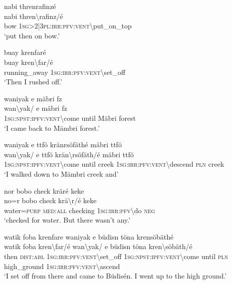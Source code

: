 \ea\label{ex:13:a1406}
nabi threnrafinzé\\
\gll nabi	thren{\textbackslash}rafinz/é\\
     bow	1\textsc{sg}>2|3\textsc{pl}:\textsc{irr}:\textsc{pfv}:\textsc{vent}{\textbackslash}put\_on\_top\\
\glt `put then on bow.'
\z

\ea\label{ex:13:a1407}
buay krenfaré\\
\gll buay	kren{\textbackslash}far/é\\
     running\_away	1\textsc{sg}:\textsc{irr}:\textsc{pfv}:\textsc{vent}{\textbackslash}set\_off\\
\glt `Then I rushed off.'
\z

\ea\label{ex:13:a1409}
waniyak e mäbri fz\\
\gll wan{\textbackslash}yak/	e	mäbri	fz\\
     1\textsc{sg}:\textsc{npst}:\textsc{ipfv}:\textsc{vent}{\textbackslash}come	until	Mäbri	forest\\
\glt `I came back to Mämbri forest.'
\z

\ea\label{ex:13:a1410}
waniyak e ttfö kränrsöfäthé mäbri ttfö\\
\gll wan{\textbackslash}yak/	e	ttfö	krän{\textbackslash}rsöfäth/é	mäbri	ttfö\\
     1\textsc{sg}:\textsc{npst}:\textsc{ipfv}:\textsc{vent}{\textbackslash}come	until	creek	1\textsc{sg}:\textsc{irr}:\textsc{pfv}:\textsc{vent}{\textbackslash}descend	\textsc{pln}	creek\\
\glt `I walked down to Mämbri creek and'
\z

\ea\label{ex:13:a1411}
nor bobo check kräré keke\\
\gll no=r	bobo	check	krä{\textbackslash}r/é	keke\\
     water=\textsc{purp}	\textsc{med}:\textsc{all}	checking	1\textsc{sg}:\textsc{irr}:\textsc{pfv}{\textbackslash}do	\textsc{neg}\\
\glt `checked for water. But there wasn't any.'
\z

\newpage
\ea\label{ex:13:a1412}
watik foba krenfare waniyak e büdisn töna krensöbäthé\\
\gll watik	foba	kren{\textbackslash}far/é	wan{\textbackslash}yak/	e	büdisn	töna	kren{\textbackslash}söbäth/é\\
     then	\textsc{dist}:\textsc{abl}	1\textsc{sg}:\textsc{irr}:\textsc{pfv}:\textsc{vent}{\textbackslash}set\_off	1\textsc{sg}:\textsc{npst}:\textsc{ipfv}:\textsc{vent}{\textbackslash}come	until	\textsc{pln}	high\_ground	1\textsc{sg}:\textsc{irr}:\textsc{pfv}:\textsc{vent}{\textbackslash}ascend\\
\glt `I set off from there and came to Büdisén. I went up to the high ground.'
\z


